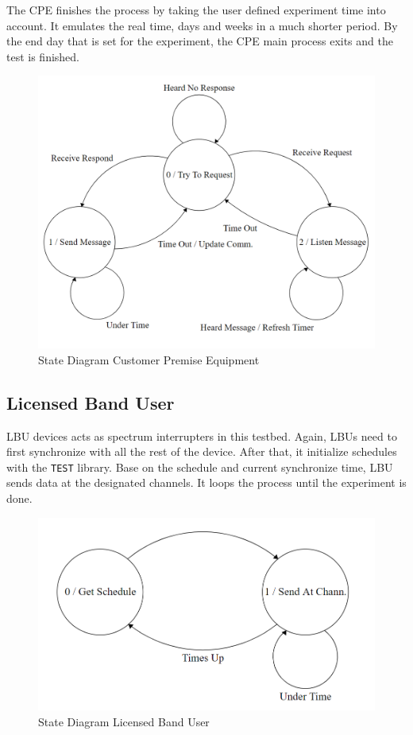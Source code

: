 The CPE finishes the process by taking the user defined experiment time into account. It emulates the real time, days and weeks in a much shorter period. By the end day that is set for the experiment, the CPE main process exits and the test is finished.  

\begin{figure}[ht]
\centering
\includegraphics[width=14cm]{figures/state_diagram_cpe.png}
\caption{State Diagram Customer Premise Equipment}
\label{fig:state_diagram_cpe}
\end{figure}

\subsection{Licensed Band User}

LBU devices acts as spectrum interrupters in this testbed. Again, LBUs need to first synchronize with all the rest of the device. After that, it initialize schedules with the \texttt{TEST} library. Base on the schedule and current synchronize time, LBU sends data at the designated channels. It loops the process until the experiment is done.

\begin{figure}[ht]
\centering
\includegraphics[width=12cm]{figures/state_diagram_lbu.png}
\caption{State Diagram Licensed Band User}
\label{fig:state_diagram_lbu}
\end{figure}